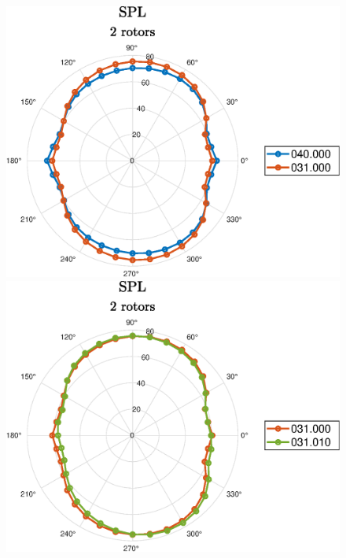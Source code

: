 \begin{frame}{\subsecname}
\begin{figure} [H]  
	\centering
	\subfloat
	{\includegraphics[scale=0.35]{Photos/spl_2rot_040000_031000.eps}}
	\subfloat
	{\includegraphics[scale=0.35]{Photos/spl_2rot_031000_031010.eps}
  }
\end{figure} 
\end{frame}

